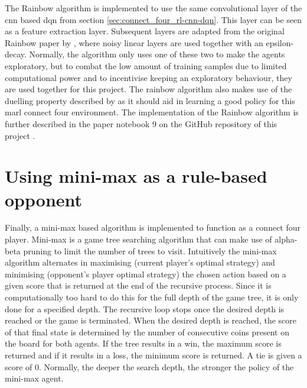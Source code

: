 The Rainbow algorithm is implemented to use the same convolutional layer of the \gls{cnn} based \gls{dqn} from section \ref{sec:connect_four_rl-cnn-dqn}.
This layer can be seen as a feature extraction layer.
Subsequent layers are adapted from the original Rainbow paper by \citet{rainbow}, where noisy linear layers are used together with an epsilon-decay.
Normally, the algorithm only uses one of these two to make the agents exploratory, but to combat the low amount of training samples due to limited computational power and to incentivise keeping an exploratory behaviour, they are used together for this project.
The rainbow algorithm also makes use of the duelling property described by \citet{dueling} as it should aid in learning a good policy for this \gls{marl} connect four environment.
The implementation of the Rainbow algorithm is further described in the paper notebook 9 on the GitHub repository of this project \citep{github_project}.


\section{Using mini-max as a rule-based opponent}
\label{sec:connect_four_rl-minimax_opponent}

Finally, a mini-max based algorithm is implemented to function as a connect four player.
Mini-max is a game tree searching algorithm that can make use of alpha-beta pruning to limit the number of trees to visit.
Intuitively the mini-max algorithm alternates in maximising (current player's optimal strategy) and minimising (opponent's player optimal strategy) the chosen action based on a given score that is returned at the end of the recursive process.
Since it is computationally too hard to do this for the full depth of the game tree, it is only done for a specified depth.
The recursive loop stops once the desired depth is reached or the game is terminated.
When the desired depth is reached, the score of that final state is determined by the number of consecutive coins present on the board for both agents.
If the tree results in a win, the maximum score is returned and if it results in a loss, the minimum score is returned.
A tie is given a score of 0.
Normally, the deeper the search depth, the stronger the policy of the mini-max agent.


